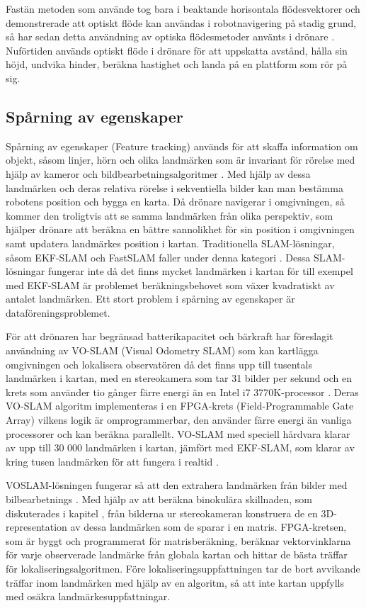 Fastän metoden som \cite{341094} använde tog bara i beaktande horisontala flödesvektorer och demonstrerade att optiskt flöde kan användas i robotnavigering på stadig grund, så har sedan detta användning av optiska flödesmetoder använts i drönare \citep{6564752}. Nuförtiden används optiskt flöde i drönare för att uppskatta avstånd, hålla sin höjd, undvika hinder, beräkna hastighet och landa på en plattform som rör på sig.

\subsection{Spårning av egenskaper}

Spårning av egenskaper (Feature tracking) används för att skaffa information om objekt, såsom linjer, hörn och olika landmärken som är invariant för rörelse med hjälp av kameror och bildbearbetningsalgoritmer \citep{geospatial}. Med hjälp av dessa landmärken och deras relativa rörelse i sekventiella bilder kan man bestämma robotens position och bygga en karta. Då drönare navigerar i omgivningen, så kommer den troligtvis att se samma landmärken från olika perspektiv, som hjälper drönare att beräkna en bättre sannolikhet för sin position i omgivningen samt updatera landmärkes position i kartan. Traditionella SLAM-lösningar, såsom EKF-SLAM och FastSLAM faller under denna kategori \citep{voslamlatif}. Dessa SLAM-lösningar fungerar inte då det finns mycket landmärken i kartan för till exempel med EKF-SLAM är problemet beräkningsbehovet som växer kvadratiskt av antalet landmärken. Ett stort problem i spårning av egenskaper är dataföreningsproblemet.

För att drönaren har begränsad batterikapacitet och bärkraft har \cite{voslam} föreslagit användning av VO-SLAM (Visual Odometry SLAM) som kan kartlägga omgivningen och lokalisera observatören då det finns upp till tusentals landmärken i kartan, med en stereokamera som tar 31 bilder per sekund och en krets som använder tio gånger färre energi än en Intel i7 3770K-processor \citep{voslam}. Deras VO-SLAM algoritm implementeras i en FPGA-krets (Field-Programmable Gate Array) vilkens logik är omprogrammerbar, den använder färre energi än vanliga processorer och kan beräkna parallellt. VO-SLAM med speciell hårdvara klarar av upp till 30 000 landmärken i kartan, jämfört med EKF-SLAM, som klarar av kring tusen landmärken för att fungera i realtid \citep{ProbabilisticRobotics, voslam}.

VOSLAM-lösningen fungerar så att den extrahera landmärken från bilder med bilbearbetnings \citep{voslam}. Med hjälp av att beräkna binokulära skillnaden, som diskuterades i kapitel , från bilderna ur stereokameran konstruera de en 3D-representation av dessa landmärken som de sparar i en matris. FPGA-kretsen, som är byggt och programmerat för matrisberäkning, beräknar vektorvinklarna för varje observerade landmärke från globala kartan och hittar de bästa träffar för lokaliseringsalgoritmen. Före lokaliseringsuppfattningen tar de bort avvikande träffar inom landmärken med hjälp av en algoritm, så att inte kartan uppfylls med osäkra landmärkesuppfattningar. 

